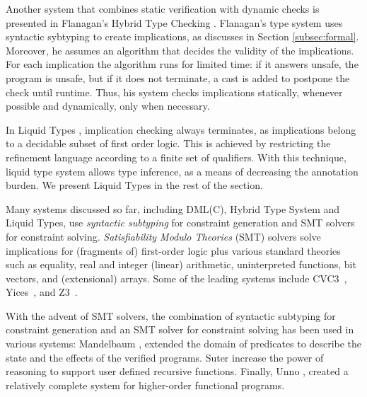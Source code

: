 Another system that combines static verification with dynamic checks is presented in 
Flanagan's Hybrid Type Checking \cite{flanagan06}. 
Flanagan's type system uses syntactic sybtyping to create implications, as discusses in
Section \ref{subsec:formal}. 
Moreover, he assumes an algorithm that decides the validity of the implications.
For each implication the algorithm runs for limited time: 
if it answers unsafe, the program is unsafe, 
but if it does not terminate, a cast is added to postpone the check 
until runtime.
%
Thus, his system
checks implications statically, whenever possible
and dynamically, only when necessary.

In Liquid Types \cite{LiquidPLDI08}, 
implication checking always terminates, 
as implications belong to 
a decidable subset of first order logic.
This is achieved by restricting the refinement language
according to a finite set of qualifiers.
With this technique, liquid type system allows 
type inference, as a means of decreasing the annotation burden.
We present Liquid Types in the rest of the section.

Many systems discussed so far, including DML(C), Hybrid Type System and Liquid Types, 
use \textit{syntactic subtyping} for constraint 
generation and SMT solvers for constraint solving.
\textit{Satisfiability Modulo Theories} (SMT) solvers solve implications 
for (fragments of) first-order logic plus various standard theories such as
equality, real and integer (linear) arithmetic, uninterpreted functions, bit vectors, and (extensional) arrays. 
Some of the leading systems include  CVC3~\cite{CVC3}, Yices~\cite{Yices}, and Z3~\cite{z3}.

With the advent of SMT solvers, 
the combination of syntactic subtyping for constraint generation
and an SMT solver for constraint solving has been used in various systems:
%
Mandelbaum \etal \cite{MandelbaumWalker03},
extended the domain of predicates to describe the state 
and the effects of the verified programs.
%
Suter \etal \cite{SuterKK11} increase the power of reasoning 
to support user defined recursive functions.
Finally, Unno \etal \cite{UnnoTK13},
created a relatively complete system for higher-order functional programs.

 
